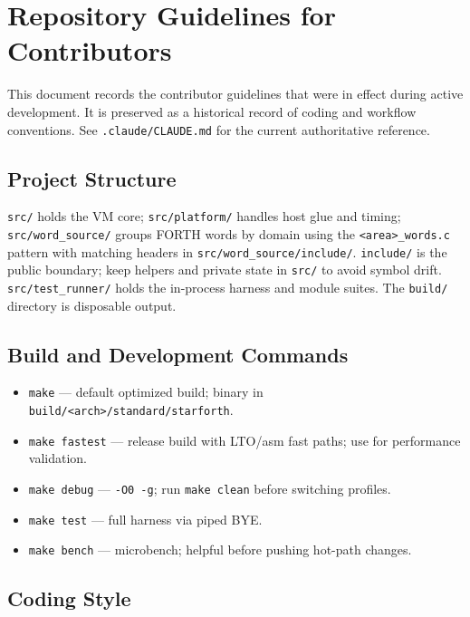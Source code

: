 
\section{Repository Guidelines for Contributors}

This document records the contributor guidelines that were in effect during
active development. It is preserved as a historical record of coding and
workflow conventions. See \texttt{.claude/CLAUDE.md} for the current
authoritative reference.

\subsection{Project Structure}

\texttt{src/} holds the VM core; \texttt{src/platform/} handles host glue
and timing; \texttt{src/word\_source/} groups FORTH words by domain using the
\texttt{<area>\_words.c} pattern with matching headers in
\texttt{src/word\_source/include/}. \texttt{include/} is the public boundary;
keep helpers and private state in \texttt{src/} to avoid symbol drift.
\texttt{src/test\_runner/} holds the in-process harness and module suites.
The \texttt{build/} directory is disposable output.

\subsection{Build and Development Commands}

\begin{itemize}
  \item \texttt{make} — default optimized build; binary in
        \texttt{build/<arch>/standard/starforth}.
  \item \texttt{make fastest} — release build with LTO/asm fast paths; use
        for performance validation.
  \item \texttt{make debug} — \texttt{-O0 -g}; run \texttt{make clean}
        before switching profiles.
  \item \texttt{make test} — full harness via piped BYE.
  \item \texttt{make bench} — microbench; helpful before pushing hot-path
        changes.
\end{itemize}

\subsection{Coding Style}

